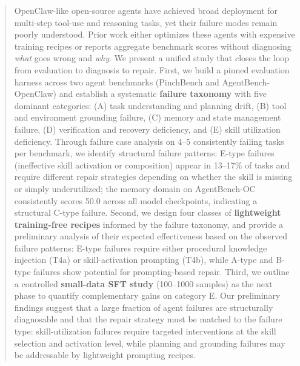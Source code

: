 \begin{abstract}
OpenClaw-like open-source agents have achieved broad deployment for multi-step tool-use and reasoning tasks, yet their failure modes remain poorly understood. Prior work either optimizes these agents with expensive training recipes or reports aggregate benchmark scores without diagnosing \emph{what} goes wrong and \emph{why}. We present a unified study that closes the loop from evaluation to diagnosis to repair. First, we build a pinned evaluation harness across two agent benchmarks (PinchBench and AgentBench-OpenClaw) and establish a systematic \textbf{failure taxonomy} with five dominant categories: (A) task understanding and planning drift, (B) tool and environment grounding failure, (C) memory and state management failure, (D) verification and recovery deficiency, and (E) skill utilization deficiency. Through failure case analysis on 4--5 consistently failing tasks per benchmark, we identify structural failure patterns: E-type failures (ineffective skill activation or composition) appear in 13--17\% of tasks and require different repair strategies depending on whether the skill is missing or simply underutilized; the memory domain on AgentBench-OC consistently scores 50.0 across all model checkpoints, indicating a structural C-type failure. Second, we design four classes of \textbf{lightweight training-free recipes} informed by the failure taxonomy, and provide a preliminary analysis of their expected effectiveness based on the observed failure patterns: E-type failures require either procedural knowledge injection (T4a) or skill-activation prompting (T4b), while A-type and B-type failures show potential for prompting-based repair. Third, we outline a controlled \textbf{small-data SFT study} (100--1000 samples) as the next phase to quantify complementary gains on category E. Our preliminary findings suggest that a large fraction of agent failures are structurally diagnosable and that the repair strategy must be matched to the failure type: skill-utilization failures require targeted interventions at the skill selection and activation level, while planning and grounding failures may be addressable by lightweight prompting recipes.
\end{abstract}
